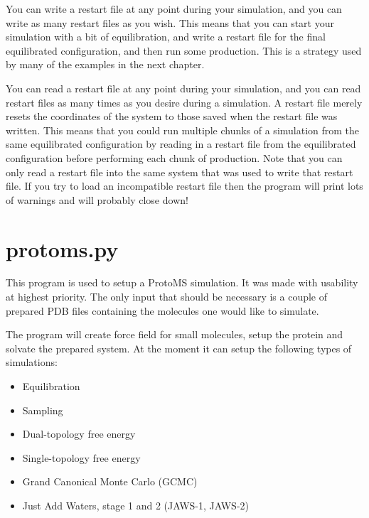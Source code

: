 \documentclass[letterpaper,10pt,english]{manual}
\begin{document}
You can write a restart file at any point during your simulation, and you can write as many restart files as you wish. This means that you can start your simulation with a bit of equilibration, and write a restart file for the final equilibrated configuration, and then run some production. This is a strategy used by many of the examples in the next chapter.

You can read a restart file at any point during your simulation, and you can read restart files as many times as you desire during a simulation. A restart file merely resets the coordinates of the system to those saved when the restart file was written. This means that you could run multiple chunks of a simulation from the same equilibrated configuration by reading in a restart file from the equilibrated configuration before performing each chunk of production. Note that you can only read a restart file into the same system that was used to write that restart file. If you try to load an incompatible restart file then the program will print lots of warnings and will probably close down!

\resetcurrentobjects
\hypertarget{--doc-protomspy}{}

\chapter{protoms.py}

This program is used to setup a ProtoMS simulation. It was made with usability at highest priority. The only input that should be necessary is a couple of prepared PDB files containing the molecules one would like to simulate.

The program will create force field for small molecules, setup the protein and solvate the prepared system. At the moment it can setup the following types of simulations:
\begin{itemize}
\item {} 
Equilibration

\item {} 
Sampling

\item {} 
Dual-topology free energy

\item {} 
Single-topology free energy

\item {} 
Grand Canonical Monte Carlo (GCMC)

\item {} 
Just Add Waters, stage 1 and 2 (JAWS-1, JAWS-2)

\end{itemize}
\end{document}
